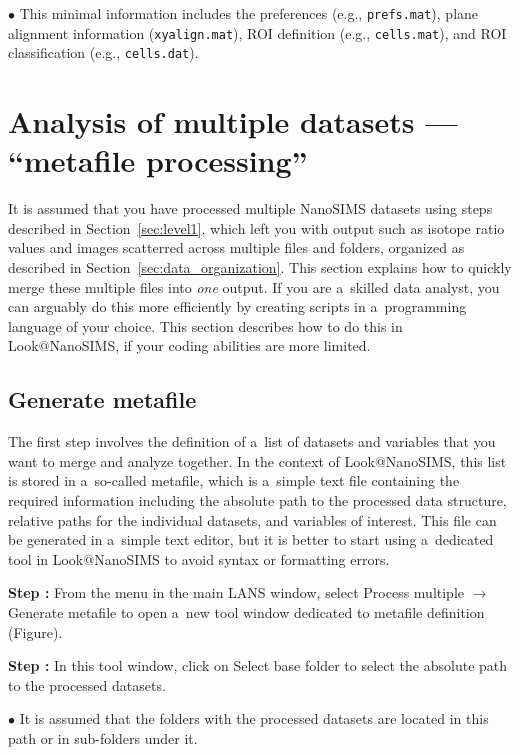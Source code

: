 \documentclass[a4paper, 11pt]{article}
\newcommand{\ttt}[1]{\texttt{#1}}
\newcommand{\lans}[1]{{\color{magenta}#1}}
\newcommand\ra{\rightarrow}
\newcounter{step}
\newcommand\s{\addtocounter{step}{1}\noindent\textbf{Step \thestep:}{ }}
\newcommand\bul{\noindent$\bullet${ }}
\begin{document}
\bul This minimal information includes the preferences (e.g., \ttt{prefs.mat}), plane alignment information (\ttt{xyalign.mat}), ROI definition (e.g., \ttt{cells.mat}), and ROI classification (e.g., \ttt{cells.dat}).


\section{Analysis of multiple datasets --- ``metafile processing''}
\label{sec:level2}

It is assumed that you have processed multiple NanoSIMS datasets using steps described in Section~\ref{sec:level1}, which left you with output such as isotope ratio values and images scatterred across multiple files and folders, organized as described in Section~\ref{sec:data_organization}. This section explains how to quickly merge these multiple files into \emph{one} output. If you are a~skilled data analyst, you can arguably do this more efficiently by creating scripts in a~programming language of your choice. This section describes how to do this in Look@NanoSIMS, if your coding abilities are more limited.


\subsection{Generate metafile}
\setcounter{step}{0}

The first step involves the definition of a~list of datasets and variables that you want to merge and analyze together. In the context of Look@NanoSIMS, this list is stored in a~so-called metafile, which is a~simple text file containing the required information including the absolute path to the processed data structure, relative paths for the individual datasets, and variables of interest. This file can be generated in a~simple text editor, but it is better to start using a~dedicated tool in Look@NanoSIMS to avoid syntax or formatting errors.

\s From the menu in the main LANS window, select \lans{Process multiple} $\ra$ \lans{Generate metafile} to open a~new tool window dedicated to metafile definition (Figure). 

\s In this tool window, click on \lans{Select base folder} to select the absolute path to the processed datasets.

\bul It is assumed that the folders with the processed datasets are located in this path or in sub-folders under it.
\end{document}
